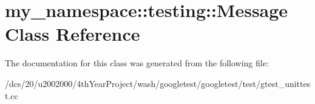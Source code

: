 \hypertarget{classmy__namespace_1_1testing_1_1Message}{}\section{my\+\_\+namespace\+:\+:testing\+:\+:Message Class Reference}
\label{classmy__namespace_1_1testing_1_1Message}


The documentation for this class was generated from the following file\+:\begin{DoxyCompactItemize}
\item 
/dcs/20/u2002000/4th\+Year\+Project/wash/googletest/googletest/test/gtest\+\_\+unittest.\+cc\end{DoxyCompactItemize}
